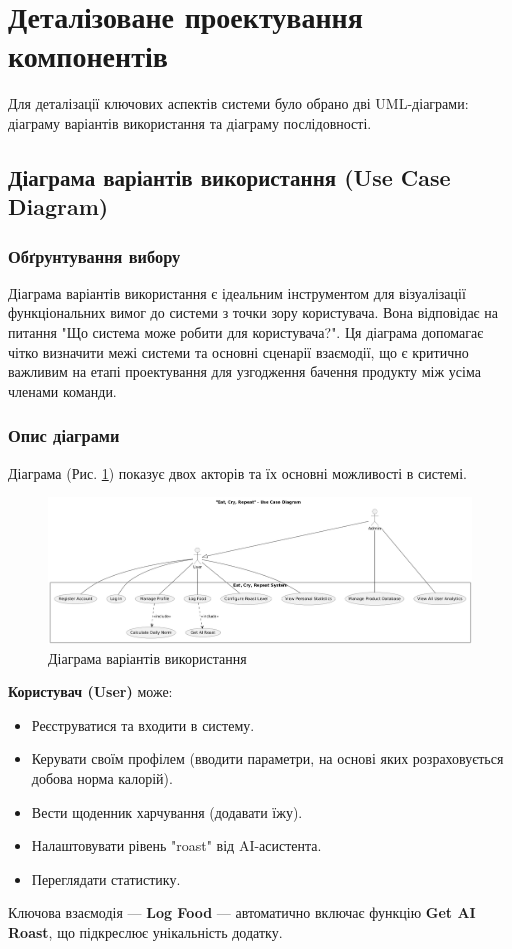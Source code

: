 \documentclass[12pt, a4paper]{article}
\begin{document}
\section{Деталізоване проектування компонентів}

Для деталізації ключових аспектів системи було обрано дві UML-діаграми:
діаграму варіантів використання та діаграму послідовності.

\subsection{Діаграма варіантів використання (Use Case Diagram)}

\subsubsection{Обґрунтування вибору}
Діаграма варіантів використання є ідеальним інструментом для візуалізації
функціональних вимог до системи з точки зору користувача. Вона відповідає на
питання "Що система може робити для користувача?". Ця діаграма допомагає чітко
визначити межі системи та основні сценарії взаємодії, що є критично важливим на
етапі проектування для узгодження бачення продукту між усіма членами команди.

\subsubsection{Опис діаграми}
Діаграма (Рис. \ref{fig:use_case}) показує двох акторів та їх основні
можливості в системі.

\begin{figure}[h!]
    \centering
    \includegraphics[width=\textwidth]{use_case.png}
    \caption{Діаграма варіантів використання}
    \label{fig:use_case}
\end{figure}

\textbf{Користувач (User)} може:
\begin{itemize}
    \item Реєструватися та входити в систему.
    \item Керувати своїм профілем (вводити параметри, на основі яких
        розраховується добова норма калорій).
    \item Вести щоденник харчування (додавати їжу).
    \item Налаштовувати рівень "roast" від AI-асистента.
    \item Переглядати статистику.
\end{itemize}
Ключова взаємодія — \textbf{Log Food} — автоматично включає функцію \textbf{Get
AI Roast}, що підкреслює унікальність додатку.
\end{document}
